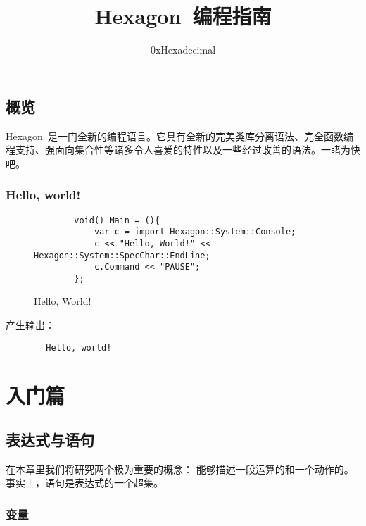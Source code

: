 \documentclass{tufte-book}
\begin{document}
\setlength{\parindent}{2em}
\setcounter{tocdepth}{1}

\frontmatter

\title{Hexagon~编程指南}
\author{0xHexadecimal}
\maketitle

\chapter{概览}
Hexagon~是一门全新的编程语言。它具有全新的完美类库分离语法、完全函数编程支持、强面向集合性等诸多令人喜爱的特性以及一些经过改善的语法。一睹为快吧。
\section{Hello, world!}
\begin{figure}[htp]
\begin{center}
  	\begin{verbatim}
		void() Main = (){
		    var c = import Hexagon::System::Console;
		    c << "Hello, World!" << Hexagon::System::SpecChar::EndLine;
		    c.Command << "PAUSE";
		};
	\end{verbatim}
  \caption{Hello, World!}
  \label{Hello,World}
\end{center}
\end{figure}
	产生输出：
	\begin{verbatim}
		Hello, world!
	\end{verbatim}


\tableofcontents

\listoffigures

\listoftables

\mainmatter
\part{入门篇}

	\chapter{表达式与语句}
		在本章里我们将研究两个极为重要的概念：
		能够描述一段运算的和一个动作的。
		事实上，语句是表达式的一个超集。
		\section{变量}
			
\end{document}
